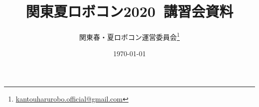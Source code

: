 \documentclass[
uplatex, a4j, dvipdfmx, 10pt, oneside
]{jsbook}
\title{関東夏ロボコン2020~講習会資料}
\author{関東春・夏ロボコン運営委員会\thanks{\href{mailto:kantouharurobo.official@gmail.com}{kantouharurobo.official@gmail.com}}}
\date{\today}
\begin{document}
\maketitle
\tableofcontents





%

\nocite{*}

\end{document}
